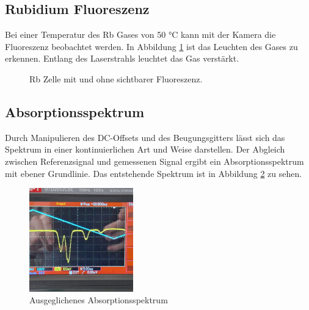 \subsection{Rubidium Fluoreszenz}
Bei einer Temperatur des Rb Gases von 50 °C kann mit der Kamera die Fluoreszenz beobachtet werden.
In Abbildung \ref{fig:rb_fluoreszenz} ist das Leuchten des Gases zu erkennen.
Entlang des Laserstrahls leuchtet das Gas verstärkt.
\begin{figure}
    \centering
    \hfill
    \caption{Rb Zelle mit und ohne sichtbarer Fluoreszenz.}\label{fig:rb_fluoreszenz}
\end{figure}

\subsection{Absorptionsspektrum}
Durch Manipulieren des DC-Offsets und des Beugungsgitters
lässt sich das Spektrum in einer kontinuierlichen Art und Weise darstellen. %
Der Abgleich zwischen Referenzsignal und gemessenen Signal ergibt ein Absorptionsspektrum mit ebener Grundlinie.
Das entstehende Spektrum ist in Abbildung \ref{fig:spektrum} zu sehen.

\begin{figure}
    \centering
    \includegraphics[width=0.4\textwidth]{./Materialien/spektrum.jpeg}
	\caption{Ausgeglichenes Absorptionsspektrum}\label{fig:spektrum}
\end{figure}

